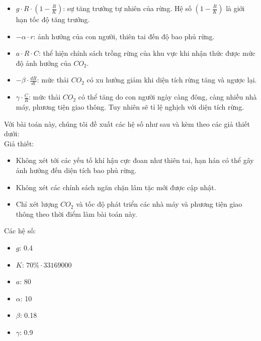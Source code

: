 \documentclass[a4paper,12pt]{report}
\begin{document}
\begin{flushleft}
\begin{itemize}
		\item $g \cdot R \cdot \left(1 - \frac{R}{K} \right)$: sự tăng trưởng tự nhiên của rừng. Hệ số $\left(1 - \frac{R}{K} \right)$ là giới hạn tốc độ tăng trưởng.

		\item $- \alpha \cdot r$: ảnh hưởng của con người, thiên tai đến độ bao phủ rừng.

		\item $a \cdot R \cdot C$: thể hiện chính sách trồng rừng của khu vực khi nhận thức được mức độ ảnh hưởng của $CO_{2}$.

		\item $- \beta \cdot \frac{dR}{dt}$: mức thải $CO_{2}$ có xu hướng giảm khi diện tích rừng tăng và ngược lại.

		\item $\gamma \cdot \frac{C}{R}$: mức thải $CO_{2}$ có thể tăng do con người ngày càng đông, càng nhiều nhà máy, phương tiện giao thông. Tuy nhiên sẽ tỉ lệ nghịch với diện tích rừng.
	\end{itemize}

	Với bài toán này, chúng tôi đề xuất các hệ số như sau và kèm theo các giả thiết dưới:
	\\

	Giả thiết:
	\begin{itemize}
		\item Không xét tới các yếu tố khí hậu cực đoan như thiên tai, hạn hán có thể gây ảnh hưởng đến diện tích bao phủ rừng.

		\item Không xét các chính sách ngăn chặn lâm tặc mới được cập nhật.

		\item Chỉ xét lượng $CO_{2}$ và tốc độ phát triển các nhà máy và phương tiện giao thông theo thời điểm làm bài toán này.
	\end{itemize}

	Các hệ số:
	\begin{itemize}
		\item $g$: 0.4

		\item $K$: $70\% \cdot 33169000$

		\item $a$: 80

		\item $\alpha$: 10

		\item $\beta$: 0.18

		\item $\gamma$: 0.9
	\end{itemize}


\end{flushleft}
\end{document}
